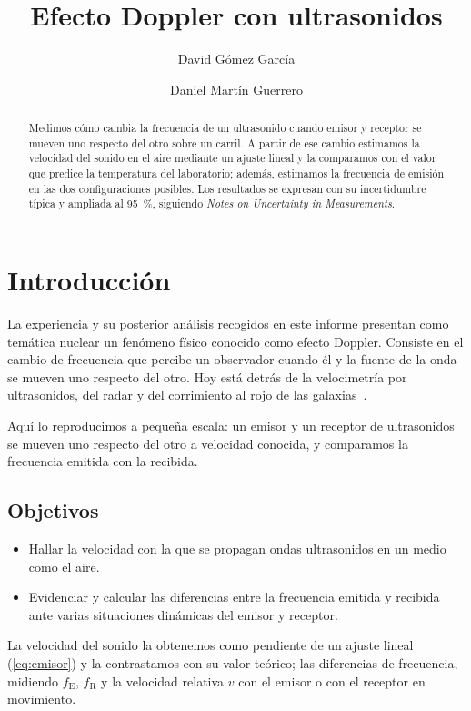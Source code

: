 \documentclass[a4paper,11pt]{amsart}
\title{Efecto Doppler con ultrasonidos}
\author{David Gómez García}
\author{Daniel Martín Guerrero}
\date{}
\numberwithin{equation}{section}
\newcommand{\fE}{f_{\mathrm{E}}}              %
\newcommand{\fR}{f_{\mathrm{R}}}              %
\theoremstyle{cienplano}
\theoremstyle{ciendef}
\theoremstyle{cienobs}
\begin{document}

\clearpage
{}
\setcounter{page}{1}

\begin{abstract}
Medimos cómo cambia la frecuencia de un ultrasonido cuando emisor y receptor
se mueven uno respecto del otro sobre un carril. A partir de ese cambio
estimamos la velocidad del sonido en el aire mediante un ajuste lineal y la
comparamos con el valor que predice la temperatura del laboratorio; además,
estimamos la frecuencia de emisión en las dos configuraciones posibles. Los
resultados se expresan con su incertidumbre típica y ampliada al
\SI{95}{\percent}, siguiendo \emph{Notes on Uncertainty in Measurements}.
\end{abstract}

\maketitle
\tableofcontents

\newpage
\section{Introducción}
La experiencia y su posterior análisis recogidos en este informe presentan
como temática nuclear un fenómeno físico conocido como efecto Doppler.
Consiste en el cambio de frecuencia que percibe un observador cuando él y la
fuente de la onda se mueven uno respecto del otro. Hoy está detrás de la
velocimetría por ultrasonidos, del radar y del corrimiento al rojo de las
galaxias~\cite{TIPLER,HALLIDAY}.

Aquí lo reproducimos a pequeña escala: un emisor y un receptor de
ultrasonidos se mueven uno respecto del otro a velocidad conocida, y
comparamos la frecuencia emitida con la recibida.

\subsection{Objetivos}\label{sec:objetivos}
\begin{itemize}
    \item Hallar la velocidad con la que se propagan ondas ultrasonidos en un medio como el aire.
    \item Evidenciar y calcular las diferencias entre la frecuencia emitida y recibida ante varias situaciones dinámicas del emisor y receptor.
\end{itemize}
La velocidad del sonido la obtenemos como pendiente de un ajuste lineal
(\cref{eq:emisor}) y la contrastamos con su valor teórico; las diferencias
de frecuencia, midiendo $\fE$, $\fR$ y la velocidad relativa $v$ con el emisor
o con el receptor en movimiento.
\end{document}
